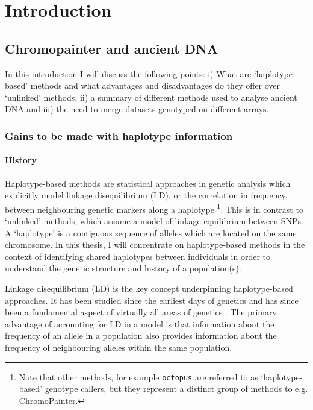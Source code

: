 \chapter{Introduction}

\section{Chromopainter and ancient DNA}

In this introduction I will discuss the following points: i) What are `haplotype-based' methods and what advantages and disadvantages do they offer over `unlinked' methods, ii) a summary of different methods used to analyse ancient DNA and iii) the need to merge datasets genotyped on different arrays. 

\subsection{Gains to be made with haplotype information}

\subsubsection{History}

Haplotype-based methods are statistical approaches in genetic analysis which explicitly model linkage disequilibrium (LD), or the correlation in frequency, between neighbouring genetic markers along a haplotype \footnote{Note that other methods, for example \texttt{octopus} \cite{octopus} are referred to as `haplotype-based' genotype callers, but they represent a distinct group of methods to e.g. ChromoPainter.}. This is in contrast to `unlinked' methods, which assume a model of linkage equilibrium between SNPs. A `haplotype' is a contiguous sequence of alleles which are located on the same chromosome. In this thesis, I will concentrate on haplotype-based methods in the context of identifying shared haplotypes between individuals in order to understand the genetic structure and history of a population(s).    

Linkage disequilibrium (LD) is the key concept underpinning haplotype-based approaches. It has been studied since the earliest days of genetics \cite{morgan1912complete, bateson1902experiments} and has since been a fundamental aspect of virtually all areas of genetics \cite{slatkin2008linkage}. The primary advantage of accounting for LD in a model is that information about the frequency of an allele in a population also provides  information about the frequency of neighbouring alleles within the same population. 

